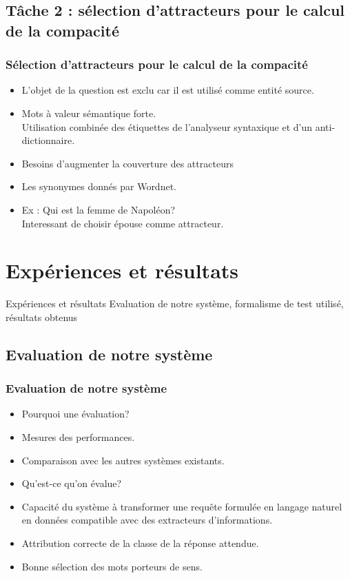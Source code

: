 \documentclass[xcolor=dvipsnames]{beamer}
\begin{document}
\subsection{Tâche 2 : sélection d'attracteurs pour le calcul de la compacité}
\frame
{
    \frametitle{Sélection d'attracteurs pour le calcul de la compacité}
    \begin{itemize}
        \item<1-> L'objet de la question est exclu car il est utilisé comme entité source.
        \item<2-> Mots à valeur sémantique forte. \\
            Utilisation combinée des étiquettes de l'analyseur syntaxique et d'un anti-dictionnaire.
        \item<3-> Besoins d'augmenter la couverture des attracteurs 
        \item<4-> Les synonymes donnés par Wordnet.
        \item<5-> Ex : Qui est la femme de Napoléon?\\
            Interessant de choisir épouse comme attracteur.
    \end{itemize}
}

\section{Expériences et résultats}
\begin{frame}
\begin{block}{\Large{Expériences et résultats}}
\tiny{Evaluation de notre système, formalisme de test utilisé, résultats obtenus}
\end{block}
\end{frame}
\subsection{Evaluation de notre système}
\frame
{
  \frametitle{Evaluation de notre système}
  \begin{itemize}
    \item<1-> Pourquoi une évaluation?
    \item<2-> Mesures des performances.
    \item<3-> Comparaison avec les autres systèmes existants.
    \item<4-> Qu'est-ce qu'on évalue?
    \item<5-> Capacité du système à transformer une requête formulée en langage naturel en données compatible avec des extracteurs d'informations.
    \item<5-> Attribution correcte de la classe de la réponse attendue.
    \item<6-> Bonne sélection des mots porteurs de sens.
  \end{itemize}
}
\end{document}

